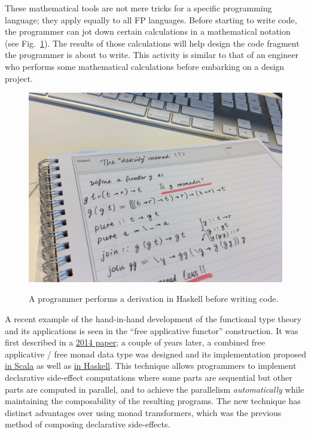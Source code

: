 These mathematical tools are not mere tricks for a specific programming
language; they apply equally to all FP languages. Before starting
to write code, the programmer can jot down certain calculations in
a mathematical notation (see Fig.\ \ref{fig:Example-calculation-in-type-theory}).
The results of those calculations will help design the code fragment
the programmer is about to write. This activity is similar to that
of an engineer who performs some mathematical calculations before
embarking on a design project.\begin{figure}%
\begin{centering}
{\footnotesize{}\vspace{-0.5\baselineskip}
\includegraphics[width=0.7\linewidth]{ftt-example}\vspace{-0.5\baselineskip}
}{\footnotesize\par}
\par\end{centering}
{\footnotesize{}\caption{A programmer performs a derivation in Haskell before writing code.\label{fig:Example-calculation-in-type-theory}}
}{\footnotesize\par}

\vspace{-1\baselineskip}
\end{figure}%
A recent example of the hand-in-hand development of the functional
type theory and its applications is seen in the ``free applicative
functor'' construction. It was first described in a \href{https://arxiv.org/pdf/1403.0749.pdf}{2014 paper};
a couple of years later, a combined free applicative / free monad
data type was designed and its implementation proposed \href{https://github.com/typelevel/cats/issues/983}{in Scala}
as well as \href{https://elvishjerricco.github.io/2016/04/08/applicative-effects-in-free-monads.html}{in Haskell}.
This technique allows programmers to implement declarative side-effect
computations where some parts are sequential but other parts are computed
in parallel, and to achieve the parallelism \emph{automatically} while
maintaining the composability of the resulting programs. The new technique
has distinct advantages over using monad transformers, which was the
previous method of composing declarative side-effects.

